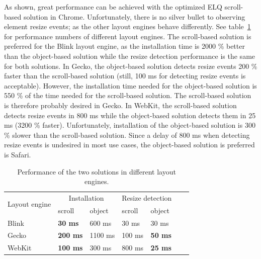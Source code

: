 \documentclass[a4paper,11pt]{kth-mag}
\newcommand\abbr[2][]{\uppercase{#2}\ifthenelse{\equal{#1}{}}%
                     {}{#1}}
\begin{document}
        As shown, great performance can be achieved with the optimized \abbr{elq} scroll-based solution in Chrome.
        Unfortunately, there is no silver bullet to observing element resize events; as the other layout engines behave differently.
        See table~\ref{table:erd-layout-engines} for performance numbers of different layout engines.
        The scroll-based solution is preferred for the Blink layout engine, as the installation time is 2000 \% better than the object-based solution while the resize detection performance is the same for both solutions.
        In Gecko, the object-based solution detects resize events 200 \% faster than the scroll-based solution (still, 100 ms for detecting resize events is acceptable).
        However, the installation time needed for the object-based solution is 550 \% of the time needed for the scroll-based solution.
        The scroll-based solution is therefore probably desired in Gecko.
        In WebKit, the scroll-based solution detects resize events in 800 ms while the object-based solution detects them in 25 ms (3200 \% faster).
        Unfortunately, installation of the object-based solution is 300 \% slower than the scroll-based solution.
        Since a delay of 800 ms when detecting resize events is undesired in most use cases, the object-based solution is preferred is Safari.

        \begin{table}[ht]\center
          \tiny
          \begin{tabular}[t]{ l l l l l l l }
            \multirow{2}{*}{Layout engine} & \multicolumn{2}{c}{Installation} & \multicolumn{2}{c}{Resize detection} \\
            & scroll & object & scroll & object \\
            \hline
            Blink   & \textbf{30 ms}   & 600 ms    & 30 ms   & 30 ms           \\
            Gecko   & \textbf{200 ms}  & 1100 ms   & 100 ms  & \textbf{50 ms}  \\
            WebKit  & \textbf{100 ms}  & 300 ms    & 800 ms  & \textbf{25 ms}  \\
          \end{tabular}
          \caption{Performance of the two solutions in different layout engines.}
          \label{table:erd-layout-engines}
        \end{table}
\end{document}
